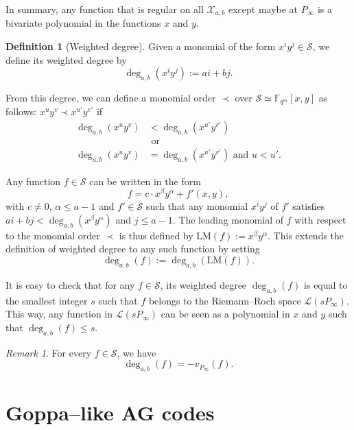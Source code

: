 \documentclass[peerreview]{IEEEtran}
\theoremstyle{plain}
\theoremstyle{definition}
\newtheorem{definition}[thm]{Definition}
\theoremstyle{remark}
\newtheorem{remark}[thm]{Remark}
\newcommand{\calL}{\mathcal{L}}
\newcommand{\calS}{\mathcal{S}}
\newcommand{\calX}{\mathcal{X}}
\newcommand{\fqm}{\mathbb{F}_{q^m}}
\newcommand{\degab}[1]{\deg_{a,b}\left(#1\right)}
\begin{document}
	In summary, any function that is regular on all $\calX_{a,b}$ except maybe at $P_\infty$ is a bivariate polynomial in the functions $x$ and $y$. 
	
	\begin{definition}[Weighted degree] 
		Given a monomial of the form $x^iy^j \in \calS$, we define its weighted degree by
		\[ \degab{x^iy^j} := ai+bj.\]
		
		From this degree, we can define a monomial order $\prec$ over $\calS \simeq \fqm[x,y]$ as follows: $x^uy^v \prec x^{u'}y^{v'}$ if
		\begin{equation}\label{eq:def_mon_order}
			\begin{aligned}			
			\degab{x^uy^v} &< \degab{x^{u'}y^{v'}} \\
			&\text{ or }\\
			 \degab{x^uy^v} &= \degab{x^{u'}y^{v'}}  \text{ and } u < u'.
			 \end{aligned}
		\end{equation}
		
		Any function $f \in \calS$ can be written in the form $$f = c \cdot x^{\beta}y^{\alpha} + f'(x,y),$$
		with $c \neq 0$, $\alpha \leq a-1$ and $f' \in \calS$ such that any monomial $x^iy^j$ of $f'$ satisfies $ai+bj < \degab{x^{\beta}y^{\alpha}}$ and $j \leq a-1$. The leading monomial of $f$ with respect to the monomial order $\prec$ is thus defined by $\mathrm{LM}(f) := x^{\beta}y^{\alpha}$. This extends the definition of weighted degree to any such function by setting 
		\[\degab{f} := \degab{\mathrm{LM}(f)}.\]
	\end{definition}
	
	It is easy to check that for any $f \in \calS$, its weighted degree $\degab{f}$ is equal to the smallest integer $s$ such that $f$ belongs to the Riemann--Roch space $\calL(sP_{\infty})$.
	This way, any function in $\calL(sP_\infty)$ can be seen as a polynomial in $x$ and $y$ such that $\degab{f}\leq s$. 
	\begin{remark} \label{rq:link_degab_valuation}
		For every $f \in \calS$, we have 
\[		\degab{f}=-v_{P_\infty}(f).\]
	\end{remark}
	
	\section{Goppa--like AG codes}\label{sec:Goppa}
\end{document}

